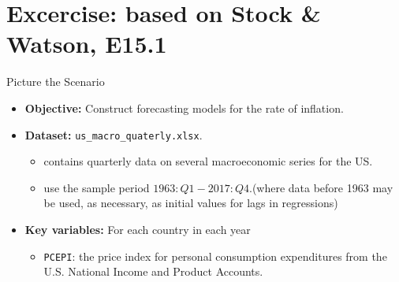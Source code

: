 \documentclass[
  10pt,
  ignorenonframetext,
]{beamer}
\providecommand{\tightlist}{%
  \setlength{\itemsep}{0pt}\setlength{\parskip}{0pt}}
\begin{document}
\hypertarget{excercise-based-on-stock-watson-e15.1}{%
\section{Excercise: based on Stock \& Watson,
E15.1}\label{excercise-based-on-stock-watson-e15.1}}

\begin{frame}[fragile]{Picture the Scenario}
\protect\hypertarget{picture-the-scenario}{}
\begin{itemize}
\tightlist
\item
  \textbf{Objective:} Construct forecasting models for the rate of
  inflation.
\end{itemize}

\vspace{0.8mm}

\begin{itemize}
\tightlist
\item
  \textbf{Dataset:} \texttt{us\_macro\_quaterly.xlsx}.

  \begin{itemize}
  \tightlist
  \item
    contains quarterly data on several macroeconomic series for the US.
  \item
    use the sample period \(1963:Q1-2017:Q4\).(where data before 1963
    may be used, as necessary, as initial values for lags in
    regressions)
  \end{itemize}
\end{itemize}

\vspace{0.8mm}

\begin{itemize}
\tightlist
\item
  \textbf{Key variables:} For each country in each year

  \begin{itemize}
  \tightlist
  \item
    \texttt{PCEPI}: the price index for personal consumption
    expenditures from the U.S. National Income and Product Accounts.
  \end{itemize}
\end{itemize}
\end{frame}
\end{document}
